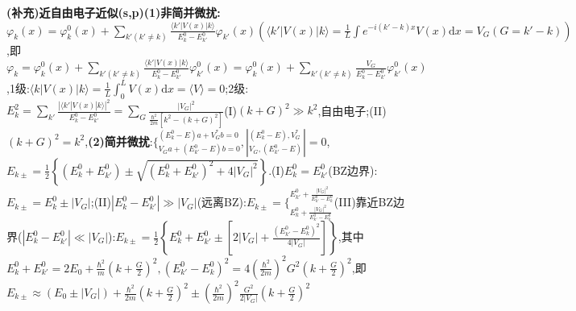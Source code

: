 \documentclass[UTF8,a4paper,10pt,twocolumn]{ctexart}
\begin{document}
  \textbf{(补充)近自由电子近似(s,p)}\textbf{(1)非简并微扰:}$\varphi_{k}(x) = \varphi_{k}^{0}(x) + \sum_{k'(k'\neq k)}\frac{\langle k'|V(x)|k\rangle}{E_{k}^{0} - E_{k'}^{0}}\varphi_{k'}(x)(\langle k'|V(x)|k\rangle = \frac{1}{L}\int e^{-i(k'-k)x}V(x)\mathrm{d}x=V_{G}(G = k'-k))$,即$\varphi_{k} = \varphi_{k}^{0}(x) + \sum_{k'(k'\neq k)}\frac{\langle k'|V(x)|k\rangle}{E_{k}^{0}-E_{k'}^{0}}\varphi_{k'}^{0}(x)= \varphi_{k}^{0}(x) + \sum_{k'(k'\neq k)}\frac{V_{G}}{E_{k}^{0} - E_{k'}^{0}}\varphi_{k'}^{0}(x)$,1级:$\langle k|V(x)|k\rangle = \frac{1}{L}\int_{0}^{L}V(x)\mathrm{d}x = \langle V\rangle = 0$;2级:$E_{k}^{2} = \sum_{k'}\frac{|\langle k'|V(x)|k\rangle|^{2}}{E_{k}^{0} - E_{k'}^{0}} = \sum_{G}\frac{|V_{G}|^{2}}{\frac{\hbar^{2}}{2m}\left[k^{2}-\left(k + G\right)^{2}\right]}$(I)$(k + G)^{2} \gg k^{2}$,自由电子;(II)$(k + G)^{2} = k^{2}$,\textbf{(2)简并微扰}:$\{^{(E_{k}^{0}-E)a+V_{G}^{*}b=0}_{V_{G}a+(E_{k'}^{0}-E)b=0}, |^{(E_{k}^{0}-E),V_{G}^{*}}_{V_{G},(E_{k'}^{0}-E)}|=0$,$E_{k\pm} = \frac{1}{2}\left\{\left(E_{k}^{0} + E_{k'}^{0}\right)\pm\sqrt{(E_{k}^{0} + E_{k'}^{0})^{2} + 4|V_{G}|^{2}}\right\}$.(I)$E_{k}^{0} = E_{k'}^{0}$(BZ边界):$E_{k\pm} = E_{k}^{0}\pm|V_{G}|$;(II)$|E_{k}^{0} - E_{k'}^{0}|\gg|V_{G}|$(远离BZ):$E_{k\pm}=\{^{E_{k'}^{0} + \frac{|V_{G}|^{2}}{E_{k'}^{0} - E_{k}^{0}}}_{E_{k}^{0}  + \frac{|V_{G}|^{2}}{E_{k'}^{0} - E_{k}^{0}}}$(III)靠近BZ边界($|E_{k}^{0} - E_{k'}^{0}|\ll|V_{G}|$):$E_{k\pm} = \frac{1}{2}\left\{E_{k}^{0} + E_{k'}^{0} \pm\left[2|V_{G}| + \frac{(E_{k'}^{0} - E_{k}^{0})^{2}}{4|V_{G}|}\right]\right\}$,其中$E_{k}^{0} + E_{k'}^{0}=2E_{0} + \frac{\hbar^{2}}{m}\left(k + \frac{G}{2}\right)^{2},(E_{k'}^{0} - E_{k}^{0})^{2}=4\left(\frac{\hbar^{2}}{2m}\right)^{2}G^{2}\left(k + \frac{G}{2}\right)^{2}$,即$E_{k\pm} \approx (E_{0}\pm |V_{G}|) + \frac{\hbar^{2}}{2m}\left(k + \frac{G}{2}\right)^{2} \pm \left(\frac{\hbar^{2}}{2m}\right)^{2} \frac{G^{2}}{2|V_{G}|}\left(k + \frac{G}{2}\right)^{2}$
   
\end{document}
